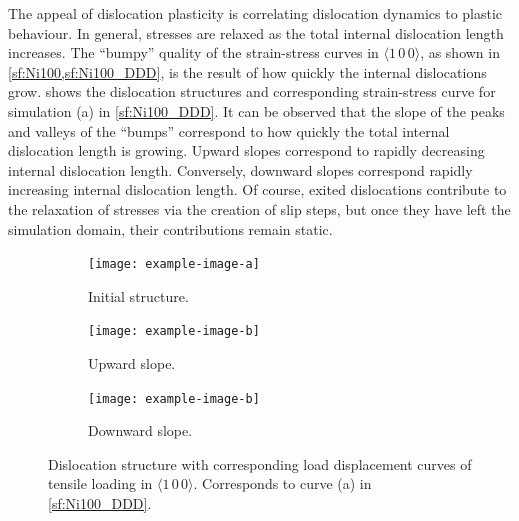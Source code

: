 The appeal of dislocation plasticity is correlating dislocation dynamics to plastic behaviour. In general, stresses are relaxed as the total internal dislocation length increases. The ``bumpy'' quality of the strain-stress curves in $\langle 1\, 0\, 0 \rangle$, as shown in \cref{sf:Ni100,sf:Ni100_DDD}, is the result of how quickly the internal dislocations grow.  shows the dislocation structures and corresponding strain-stress curve for simulation (a) in \cref{sf:Ni100_DDD}. It can be observed that the slope of the peaks and valleys of the ``bumps'' correspond to how quickly the total internal dislocation length is growing. Upward slopes correspond to rapidly decreasing internal dislocation length. Conversely, downward slopes correspond rapidly increasing internal dislocation length. Of course, exited dislocations contribute to the relaxation of stresses via the creation of slip steps, but once they have left the simulation domain, their contributions remain static.
\begin{figure}
    \centering
    \begin{subfigure}[t]{\linewidth}
        \centering
        \texttt{[image: example-image-a]}
        \caption{Initial structure.}
    \end{subfigure}

    \begin{subfigure}[t]{\linewidth}
        \centering
        \texttt{[image: example-image-b]}
        \caption{Upward slope.}
    \end{subfigure}

    \begin{subfigure}[t]{\linewidth}
        \centering
        \texttt{[image: example-image-b]}
        \caption{Downward slope.}
    \end{subfigure}
    \caption[Dislocation structure with corresponding load displacement curves of tensile loading in $\langle 1\, 0\, 0 \rangle$.]{Dislocation structure with corresponding load displacement curves of tensile loading in $\langle 1\, 0\, 0 \rangle$. Corresponds to curve (a) in \cref{sf:Ni100_DDD}.}
    \label{f:Ni100_bumps}
\end{figure}

